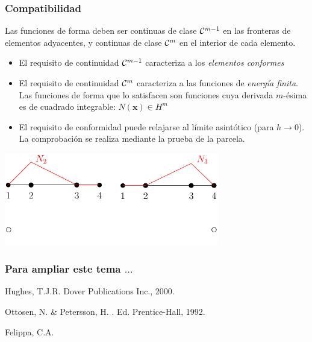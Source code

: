 \documentclass[handout]{beamer}
\begin{document}
\begin{frame}
\frametitle{Compatibilidad}
Las funciones de forma deben ser continuas de clase ${\cal C}^{m-1}$ en las 
fronteras
de elementos adyacentes, y continuas de clase ${\cal C}^{m}$ en el
interior de cada elemento.
\begin{itemize}
\item El requisito de continuidad ${\cal C}^{m-1}$ caracteriza a los
{\em elementos conformes}
\item El requisito de continuidad ${\cal C}^{m}$ caracteriza a las
funciones de {\em energía finita}. Las funciones de forma que lo
satisfacen son funciones cuya derivada $m$-ésima es de cuadrado
integrable: $N(\bm{x}) \in H^m$
\item El requisito de conformidad puede relajarse al límite
asintótico (para $h \rightarrow 0$). La comprobación se realiza mediante
la prueba de la parcela.
\end{itemize}
\begin{center}
\includegraphics[width=0.7\textwidth]{shape1comp}
\end{center}
\end{frame}
\begin{frame}
\frametitle{Para ampliar este tema $\ldots$}

\begin{thebibliography}{10}
\beamertemplatebookbibitems
{}
{\sc Hughes, T.J.R.}
\newblock Dover Publications Inc., 2000.

{\sc Ottosen, N. \& Petersson, H.}
.
\newblock Ed. Prentice-Hall, 1992.

\beamertemplatearrowbibitems
{}
{\sc Felippa, C.A.}
\end{thebibliography}
\end{frame}
\end{document}
